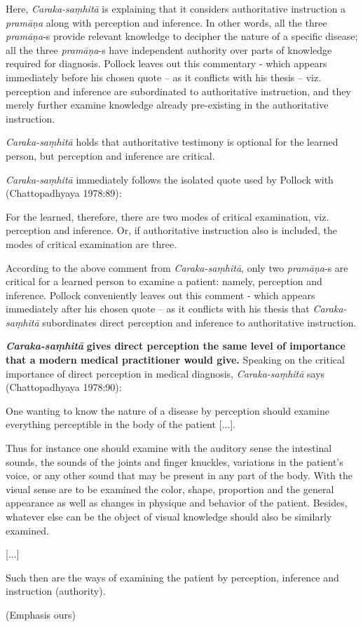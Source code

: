 Here, {\sl Caraka-saṃhitā} is explaining that it considers authoritative instruction a {\sl pramāṇa} along with perception and inference. In other words, all the three {\sl pramāṇa}-s provide relevant knowledge to decipher the nature of a specific disease; all the three {\sl pramāṇa}-s have independent authority over parts of knowledge required for diagnosis. Pollock leaves out this commentary - which appears immediately before his chosen quote -- as it conflicts with his thesis -- viz. perception and inference are subordinated to authoritative instruction, and they merely further examine knowledge already pre-existing in the authoritative instruction.

{\sl Caraka-saṃhitā} holds that authoritative testimony is optional for the learned person, but perception and inference are critical.

{\sl Caraka-saṃhitā} immediately follows the isolated quote used by Pollock with (Chattopadhyaya 1978:89):
\begin{myquote}
For the learned, therefore, there are two modes of critical examination, viz. perception and inference. Or, if authoritative instruction also is included, the modes of critical examination are three.
\end{myquote}

According to the above comment from {\sl Caraka-saṃhitā}, only two {\sl pramāṇa}-s are critical for a learned person to examine a patient: namely, perception and inference. Pollock conveniently leaves out this comment - which appears immediately after his chosen quote -- as it conflicts with his thesis that {\sl Caraka-saṃhitā} subordinates direct perception and inference to authoritative instruction.  

{{\sl\bfseries Caraka-saṃhitā}\relax} {\bf gives direct perception the same level of importance that a modern medical practitioner would give.} Speaking on the critical importance of direct perception in medical diagnosis, {\sl Caraka-saṃhitā} says (Chattopadhyaya 1978:90):
\begin{myquote}
One wanting to know the nature of a disease by perception should examine everything perceptible in the body of the patient [...].

Thus for instance one should examine with the auditory sense the intestinal sounds, the sounds of the joints and finger knuckles, variations in the patient's voice, or any other sound that may be present in any part of the body.  With the visual sense are to be examined the color, shape, proportion and the general appearance as well as changes in physique and behavior of the patient.  Besides, whatever else can be the object of visual knowledge should also be similarly examined.

[...]

Such then are the ways of examining the patient by perception, inference and instruction (authority).

\hfill (Emphasis ours)
\end{myquote}

